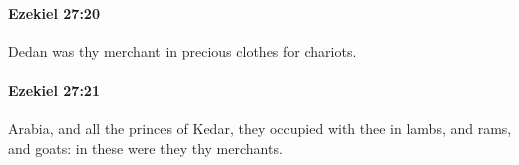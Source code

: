 		\paragraph{Ezekiel 27:20} %
			\label{EZEKIEL-27-20}

			Dedan was thy merchant in precious clothes for chariots.


		\paragraph{Ezekiel 27:21} %
			\label{EZEKIEL-27-21}

			Arabia, and all the princes of Kedar, they occupied with thee in lambs, and rams, and goats: in these were they thy merchants.


